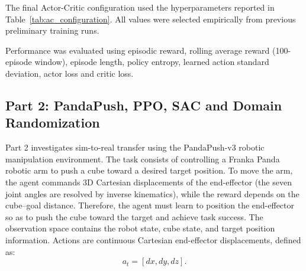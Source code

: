 The final Actor-Critic configuration used the hyperparameters reported in Table~\ref{tab:ac_configuration}.
All values were selected empirically from previous preliminary training runs.


\begin{table}[ht]
\centering
\caption{Final Actor-Critic Configuration}
\label{tab:ac_configuration}
\end{table}



Performance was evaluated using episodic reward, rolling average reward (100-episode window),
episode length, policy entropy, learned action standard deviation, actor loss and critic loss.
























\subsection{Part 2: PandaPush, PPO, SAC and Domain Randomization}

Part 2 investigates sim-to-real transfer using the PandaPush-v3 robotic manipulation environment. The task consists of controlling a Franka Panda robotic arm to push a cube toward a desired target position.
To move the arm, the agent commands 3D Cartesian displacements of the end-effector (the seven joint angles are resolved by inverse kinematics), while the reward depends on the cube--goal distance.
Therefore, the agent must learn to position the end-effector so as to push the cube toward the target and achieve task success.
The observation space contains the robot state, cube state, and target position information. Actions are continuous Cartesian end-effector displacements, defined as:
\[
a_t=[dx,dy,dz].
\]

